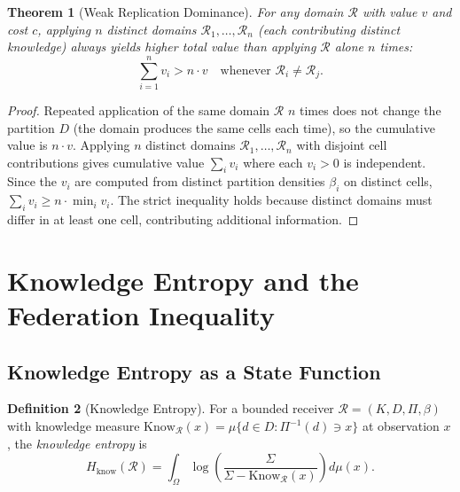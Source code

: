 \documentclass[twocolumn,11pt,a4paper]{article}
\theoremstyle{plain}
\newtheorem{theorem}{Theorem}[section]
\theoremstyle{definition}
\newtheorem{definition}[theorem]{Definition}
\theoremstyle{remark}
\begin{document}
\begin{theorem}[Weak Replication Dominance]
\label{thm:weak_rep}
For any domain $\mathcal{R}$ with value $v$ and cost $c$, applying $n$ \emph{distinct} domains $\mathcal{R}_1,\ldots,\mathcal{R}_n$ (each contributing distinct knowledge) always yields higher total value than applying $\mathcal{R}$ alone $n$ times:
\begin{equation}
  \sum_{i=1}^n v_i > n\cdot v \quad \text{whenever } \mathcal{R}_i \ne \mathcal{R}_j.
\end{equation}
\end{theorem}

\begin{proof}
Repeated application of the same domain $\mathcal{R}$ $n$ times does not change the partition $D$ (the domain produces the same cells each time), so the cumulative value is $n\cdot v$.  Applying $n$ distinct domains $\mathcal{R}_1,\ldots,\mathcal{R}_n$ with disjoint cell contributions gives cumulative value $\sum_i v_i$ where each $v_i > 0$ is independent.  Since the $v_i$ are computed from distinct partition densities $\beta_i$ on distinct cells, $\sum_i v_i \ge n\cdot\min_i v_i$.  The strict inequality holds because distinct domains must differ in at least one cell, contributing additional information.
\end{proof}

\section{Knowledge Entropy and the Federation Inequality}
\label{sec:knowledge_entropy}

\subsection{Knowledge Entropy as a State Function}

\begin{definition}[Knowledge Entropy]
\label{def:know_entropy}
For a bounded receiver $\mathcal{R} = (K,D,\Pi,\beta)$ with knowledge measure $\mathrm{Know}_\mathcal{R}(x) = \mu\{d \in D : \Pi^{-1}(d) \ni x\}$ at observation $x$, the \emph{knowledge entropy} is
\begin{equation}
  H_\mathrm{know}(\mathcal{R}) = \int_\Omega \log\!\left(\frac{\Sigma}{\Sigma - \mathrm{Know}_\mathcal{R}(x)}\right)d\mu(x).
  \label{eq:know_entropy}
\end{equation}
\end{definition}
\end{document}
